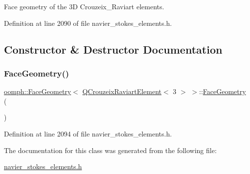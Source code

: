 Face geometry of the 3D Crouzeix\+\_\+\+Raviart elements. 

Definition at line 2090 of file navier\+\_\+stokes\+\_\+elements.\+h.



\subsection{Constructor \& Destructor Documentation}
\mbox{\label{classoomph_1_1FaceGeometry_3_01QCrouzeixRaviartElement_3_013_01_4_01_4_a3183acb3d5e73accbd0fb5258468e377}} 
\subsubsection{\texorpdfstring{Face\+Geometry()}{FaceGeometry()}}
{\footnotesize\ttfamily \hyperlink{classoomph_1_1FaceGeometry}{oomph\+::\+Face\+Geometry}$<$ \hyperlink{classoomph_1_1QCrouzeixRaviartElement}{Q\+Crouzeix\+Raviart\+Element}$<$ 3 $>$ $>$\+::\hyperlink{classoomph_1_1FaceGeometry}{Face\+Geometry} (\begin{DoxyParamCaption}{ }\end{DoxyParamCaption})\hspace{0.3cm}{\ttfamily [inline]}}



Definition at line 2094 of file navier\+\_\+stokes\+\_\+elements.\+h.



The documentation for this class was generated from the following file\+:\begin{DoxyCompactItemize}
\item 
\hyperlink{navier__stokes__elements_8h}{navier\+\_\+stokes\+\_\+elements.\+h}\end{DoxyCompactItemize}
